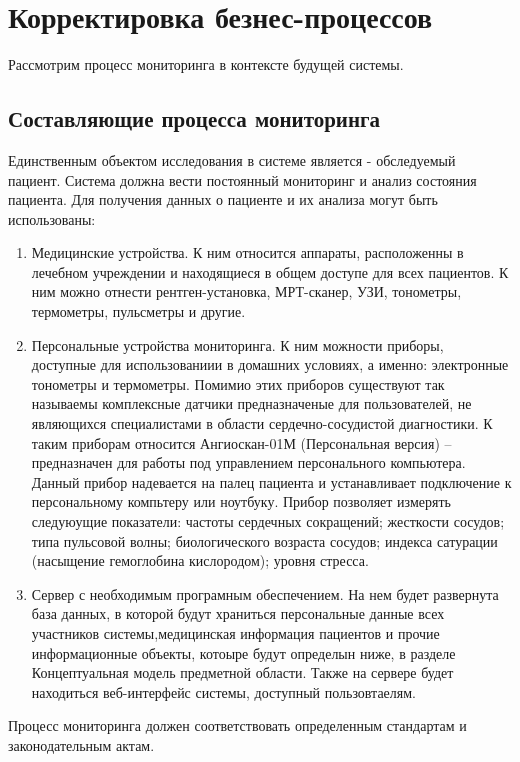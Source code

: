 \newpage
\chapter{Корректировка безнес-процессов}
Рассмотрим процесс мониторинга в контексте будущей системы.

\section{Составляющие процесса мониторинга}

Единственным объектом исследования в системе является - обследуемый пациент. Система должна вести постоянный мониторинг и анализ состояния пациента.
Для получения данных о пациенте и их анализа могут быть использованы:

\begin{enumerate}
  \item Медицинские устройства. К ним относится аппараты, расположенны в
  лечебном учреждении и находящиеся в общем доступе для всех пациентов. К ним можно отнести рентген-установка, МРТ-сканер, УЗИ, тонометры, термометры, пульсметры и другие.
  \item Персональные устройства мониторинга. К ним можности приборы, доступные
  для использованиии в домашних условиях, а именно: электронные тонометры и термометры. Помимио этих приборов существуют так называемы комплексные датчики предназначеные для пользователей, не являющихся специалистами в области сердечно-сосудистой диагностики. К таким приборам относится Ангиоскан-01М (Персональная версия) – предназначен для работы под управлением персонального компьютера. Данный прибор надевается на палец пациента и устанавливает подключение к персональному компьтеру или ноутбуку. Прибор позволяет измерять следуюущие показатели: частоты сердечных сокращений; жесткости сосудов; типа пульсовой волны; биологического возраста сосудов; индекса сатурации (насыщение гемоглобина кислородом); уровня стресса.
  \item Сервер с необходимым програмным обеспечением. На нем будет развернута
  база данных, в которой будут храниться персональные данные всех участников системы,медицинская информация пациентов и прочие информационные объекты, котоыре будут определын ниже,  в разделе Концептуальная модель предметной области. Также на сервере будет находиться веб-интерфейс системы, доступный пользовтаелям.
\end{enumerate}

Процесс мониторинга должен соответствовать определенным стандартам и законодательным актам.

